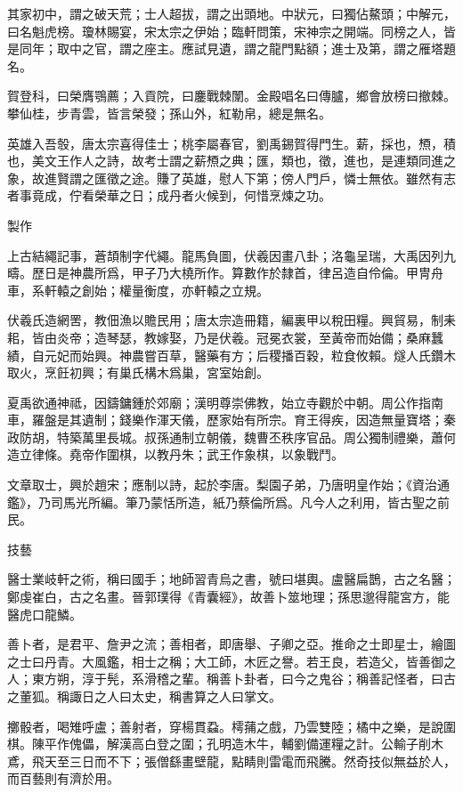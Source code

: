\documentclass[12pt,a4paper]{ctexbook}
\begin{document}
其家初中，謂之破天荒；士人超拔，謂之出頭地。中狀元，曰獨佔鰲頭；中解元，曰名魁虎榜。瓊林賜宴，宋太宗之伊始；臨軒問策，宋神宗之開端。同榜之人，皆是同年；取中之官，謂之座主。應試見遺，謂之龍門點額；進士及第，謂之雁塔題名。\par
賀登科，曰榮膺鶚薦；入貢院，曰鏖戰棘闈。金殿唱名曰傳臚，鄉會放榜曰撤棘。攀仙桂，步青雲，皆言榮發；孫山外，紅勒帛，總是無名。\par
英雄入吾彀，唐太宗喜得佳士；桃李屬春官，劉禹錫賀得門生。薪，採也，槱，積也，美文王作人之詩，故考士謂之薪槱之典；匯，類也，徵，進也，是連類同進之象，故進賢謂之匯徵之途。賺了英雄，慰人下第；傍人門戶，憐士無依。雖然有志者事竟成，佇看榮華之日；成丹者火候到，何惜烹煉之功。\par
製作\par
上古結繩記事，蒼頡制字代繩。龍馬負圖，伏羲因畫八卦；洛龜呈瑞，大禹因列九疇。歷日是神農所爲，甲子乃大橈所作。算數作於隸首，律呂造自伶倫。甲冑舟車，系軒轅之創始；權量衡度，亦軒轅之立規。\par
伏羲氏造網罟，教佃漁以贍民用；唐太宗造冊籍，編裏甲以稅田糧。興貿易，制耒耜，皆由炎帝；造琴瑟，教嫁娶，乃是伏羲。冠冕衣裳，至黃帝而始備；桑麻蠶績，自元妃而始興。神農嘗百草，醫藥有方；后稷播百穀，粒食攸賴。燧人氏鑽木取火，烹飪初興；有巢氏構木爲巢，宮室始創。\par
夏禹欲通神祗，因鑄鏞鍾於郊廟；漢明尊崇佛教，始立寺觀於中朝。周公作指南車，羅盤是其遺制；錢樂作渾天儀，歷家始有所宗。育王得疾，因造無量寶塔；秦政防胡，特築萬里長城。叔孫通制立朝儀，魏曹丕秩序官品。周公獨制禮樂，蕭何造立律條。堯帝作圍棋，以教丹朱；武王作象棋，以象戰鬥。\par
文章取士，興於趙宋；應制以詩，起於李唐。梨園子弟，乃唐明皇作始；《資治通鑑》，乃司馬光所編。筆乃蒙恬所造，紙乃蔡倫所爲。凡今人之利用，皆古聖之前民。\par
技藝\par
醫士業岐軒之術，稱曰國手；地師習青烏之書，號曰堪輿。盧醫扁鵲，古之名醫；鄭虔崔白，古之名畫。晉郭璞得《青囊經》，故善卜筮地理；孫思邈得龍宮方，能醫虎口龍鱗。\par
善卜者，是君平、詹尹之流；善相者，即唐舉、子卿之亞。推命之士即星士，繪圖之士曰丹青。大風鑑，相士之稱；大工師，木匠之譽。若王良，若造父，皆善御之人；東方朔，淳于髡，系滑稽之輩。稱善卜卦者，曰今之鬼谷；稱善記怪者，曰古之董狐。稱諏日之人曰太史，稱書算之人曰掌文。\par
擲骰者，喝雉呼盧；善射者，穿楊貫蝨。樗蒱之戲，乃雲雙陸；橘中之樂，是說圍棋。陳平作傀儡，解漢高白登之圍；孔明造木牛，輔劉備運糧之計。公輸子削木鳶，飛天至三日而不下；張僧繇畫壁龍，點睛則雷電而飛騰。然奇技似無益於人，而百藝則有濟於用。\par
\end{document}
